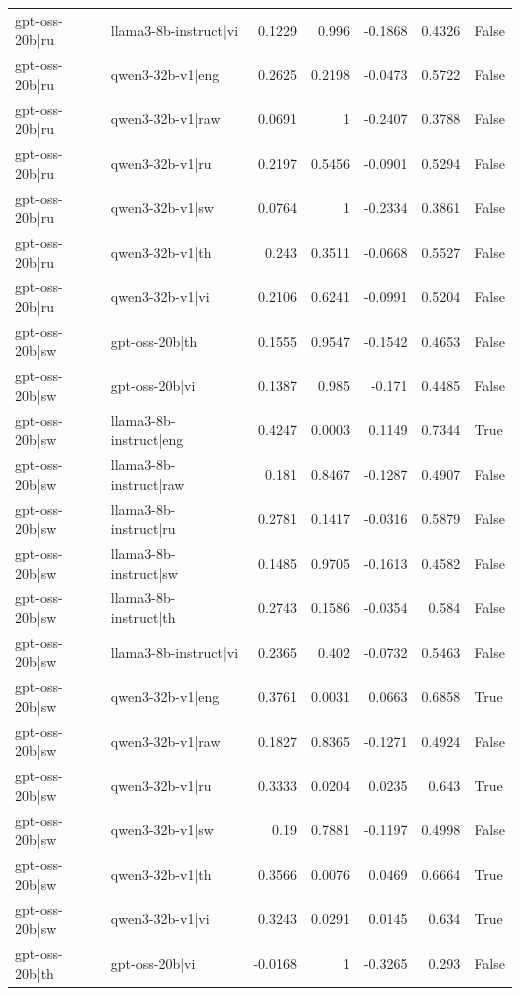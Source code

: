 \begin{table}
\begin{tabular}{l l r r r r l}
gpt-oss-20b|ru & llama3-8b-instruct|vi & 0.1229 & 0.996 & -0.1868 & 0.4326 & False \\
gpt-oss-20b|ru & qwen3-32b-v1|eng & 0.2625 & 0.2198 & -0.0473 & 0.5722 & False \\
gpt-oss-20b|ru & qwen3-32b-v1|raw & 0.0691 & 1 & -0.2407 & 0.3788 & False \\
gpt-oss-20b|ru & qwen3-32b-v1|ru & 0.2197 & 0.5456 & -0.0901 & 0.5294 & False \\
gpt-oss-20b|ru & qwen3-32b-v1|sw & 0.0764 & 1 & -0.2334 & 0.3861 & False \\
gpt-oss-20b|ru & qwen3-32b-v1|th & 0.243 & 0.3511 & -0.0668 & 0.5527 & False \\
gpt-oss-20b|ru & qwen3-32b-v1|vi & 0.2106 & 0.6241 & -0.0991 & 0.5204 & False \\
gpt-oss-20b|sw & gpt-oss-20b|th & 0.1555 & 0.9547 & -0.1542 & 0.4653 & False \\
gpt-oss-20b|sw & gpt-oss-20b|vi & 0.1387 & 0.985 & -0.171 & 0.4485 & False \\
gpt-oss-20b|sw & llama3-8b-instruct|eng & 0.4247 & 0.0003 & 0.1149 & 0.7344 & True \\
gpt-oss-20b|sw & llama3-8b-instruct|raw & 0.181 & 0.8467 & -0.1287 & 0.4907 & False \\
gpt-oss-20b|sw & llama3-8b-instruct|ru & 0.2781 & 0.1417 & -0.0316 & 0.5879 & False \\
gpt-oss-20b|sw & llama3-8b-instruct|sw & 0.1485 & 0.9705 & -0.1613 & 0.4582 & False \\
gpt-oss-20b|sw & llama3-8b-instruct|th & 0.2743 & 0.1586 & -0.0354 & 0.584 & False \\
gpt-oss-20b|sw & llama3-8b-instruct|vi & 0.2365 & 0.402 & -0.0732 & 0.5463 & False \\
gpt-oss-20b|sw & qwen3-32b-v1|eng & 0.3761 & 0.0031 & 0.0663 & 0.6858 & True \\
gpt-oss-20b|sw & qwen3-32b-v1|raw & 0.1827 & 0.8365 & -0.1271 & 0.4924 & False \\
gpt-oss-20b|sw & qwen3-32b-v1|ru & 0.3333 & 0.0204 & 0.0235 & 0.643 & True \\
gpt-oss-20b|sw & qwen3-32b-v1|sw & 0.19 & 0.7881 & -0.1197 & 0.4998 & False \\
gpt-oss-20b|sw & qwen3-32b-v1|th & 0.3566 & 0.0076 & 0.0469 & 0.6664 & True \\
gpt-oss-20b|sw & qwen3-32b-v1|vi & 0.3243 & 0.0291 & 0.0145 & 0.634 & True \\
gpt-oss-20b|th & gpt-oss-20b|vi & -0.0168 & 1 & -0.3265 & 0.293 & False \\

\end{tabular}
\end{table}
